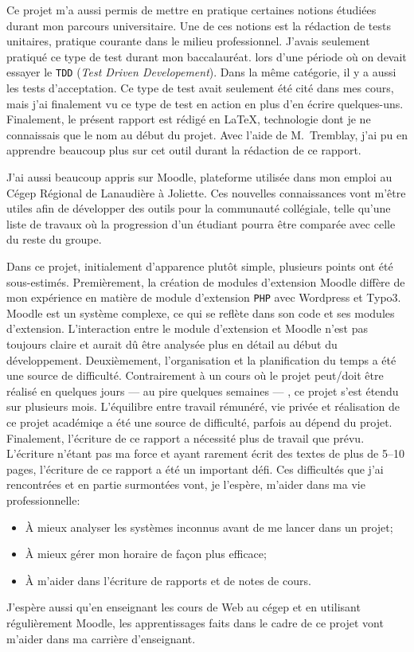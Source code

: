 \begin{conclusion}
Ce projet m'a aussi permis de mettre en pratique certaines notions \'etudi\'ees durant mon parcours universitaire.
Une de ces notions est la r\'edaction de tests unitaires, pratique courante dans le milieu professionnel.
J'avais seulement pratiqu\'e ce type de test durant mon baccalaur\'eat. lors d'une p\'eriode o\`u on devait essayer le \texttt{TDD} (\textit{Test Driven Developement}).
Dans la m\^eme cat\'egorie, il y a aussi les tests d'acceptation.
Ce type de test avait seulement \'et\'e cit\'e dans mes cours, mais j'ai finalement vu ce type de test en action en plus d'en \'ecrire quelques-uns.
Finalement, le pr\'esent rapport est r\'edig\'e en \LaTeX, technologie dont je ne connaissais que le nom au d\'ebut du projet.
Avec l'aide de M.\ Tremblay, j'ai pu en apprendre beaucoup plus sur cet outil durant la r\'edaction de ce rapport.

J'ai aussi beaucoup appris sur Moodle, plateforme utilis\'ee dans mon emploi au C\'egep R\'egional de Lanaudi\`ere \`a Joliette.
Ces nouvelles connaissances vont m'\^etre utiles afin de d\'evelopper des outils pour la communaut\'e coll\'egiale, telle qu'une liste de travaux o\`u la progression d'un \'etudiant pourra \^etre compar\'ee avec celle du reste du groupe.

Dans ce projet, initialement d'apparence plut\^ot simple, plusieurs points ont \'et\'e sous-estim\'es.
Premi\`erement, la cr\'eation de modules d'extension Moodle diff\`ere de mon exp\'erience en mati\`ere de module d'extension \texttt{PHP} avec Wordpress et Typo3.
Moodle est un syst\`eme complexe, ce qui se refl\`ete dans son code et ses modules d'extension.
L'interaction entre le module d'extension et Moodle n'est pas toujours claire et aurait d\^u \^etre analys\'ee plus en d\'etail au d\'ebut du d\'eveloppement.
Deuxi\`emement, l'organisation et la planification du temps a \'et\'e une source de difficult\'e.
Contrairement \`a un cours o\`u le projet peut/doit \^etre r\'ealis\'e en quelques jours --- au pire quelques semaines --- , ce projet s'est \'etendu sur plusieurs mois.
L'\'equilibre entre travail r\'emun\'er\'e,  vie priv\'ee et r\'ealisation de ce projet acad\'emiqe a \'et\'e une source de difficult\'e, parfois au d\'epend du projet.
Finalement, l'\'ecriture de ce rapport a n\'ecessit\'e plus de travail que pr\'evu.
L'\'ecriture n'\'etant pas ma force et ayant rarement \'ecrit des textes de plus de 5--10 pages, l'\'ecriture de ce rapport a \'et\'e un important d\'efi.
Ces difficult\'es que j'ai rencontr\'ees et en partie surmont\'ees vont, je l'esp\`ere, m'aider dans ma vie professionnelle:
\begin{itemize}
  \item \`A mieux analyser les syst\`emes inconnus avant de me lancer dans un projet;
  \item \`A mieux g\'erer mon horaire de fa\c{c}on plus efficace;
  \item \`A m'aider dans l'\'ecriture de rapports et de notes de cours.
\end{itemize}
J'esp\`ere aussi qu'en enseignant les cours de Web au c\'egep et en utilisant r\'eguli\`erement Moodle, les apprentissages faits dans le cadre de ce projet vont m'aider dans ma carri\`ere d'enseignant.
\end{conclusion}
